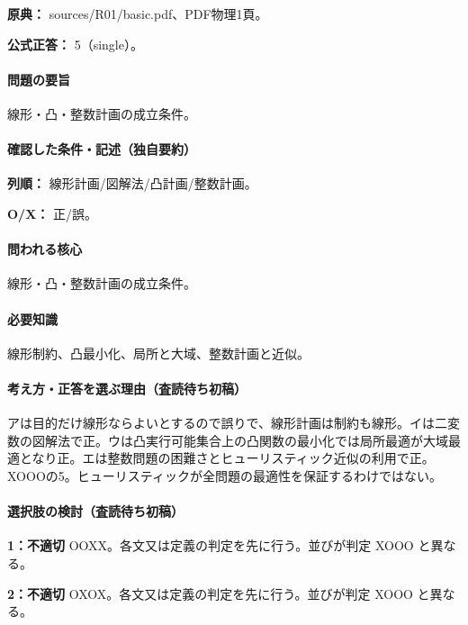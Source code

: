 \noindent\textbf{原典：} sources/R01/basic.pdf、PDF物理1頁。

\textbf{公式正答：} 5（single）。

\paragraph{問題の要旨} 線形・凸・整数計画の成立条件。

\paragraph{確認した条件・記述（独自要約）}\mbox{}\par

\noindent\textbf{列順：} 線形計画/図解法/凸計画/整数計画。\par

\noindent\textbf{O/X：} 正/誤。\par

\paragraph{問われる核心} 線形・凸・整数計画の成立条件。

\paragraph{必要知識} 線形制約、凸最小化、局所と大域、整数計画と近似。

\paragraph{考え方・正答を選ぶ理由（査読待ち初稿）} アは目的だけ線形ならよいとするので誤りで、線形計画は制約も線形。イは二変数の図解法で正。ウは凸実行可能集合上の凸関数の最小化では局所最適が大域最適となり正。エは整数問題の困難さとヒューリスティック近似の利用で正。XOOOの5。ヒューリスティックが全問題の最適性を保証するわけではない。

\paragraph{選択肢の検討（査読待ち初稿）}\mbox{}\par

\noindent\textbf{1：不適切} OOXX。各文又は定義の判定を先に行う。並びが判定 XOOO と異なる。\par

\noindent\textbf{2：不適切} OXOX。各文又は定義の判定を先に行う。並びが判定 XOOO と異なる。\par

